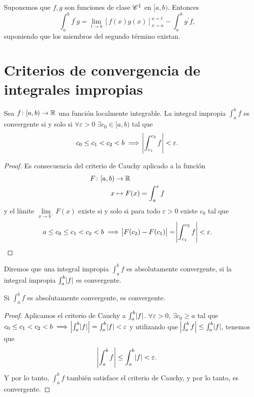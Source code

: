 \begin{prop}
    Suponemos que $f,g$ son funciones de clase $\mathscr{C}^1$ en $[a,b)$. Entonces
    \[
        \int^b_a f^\prime g = \lim_{t \to b} \left[ f(x)g(x)\right]^{x=t}_{x=a}
        - \int^b_a g^\prime f,
    \]
    suponiendo que los miembros del segundo t\'ermino existan.
\end{prop}



\section{Criterios de convergencia de integrales impropias}

\begin{prop}
    Sea $f \colon [a,b) \to \mathbb{R}$ una función localmente integrable. La integral
    impropia $\int^b_a f$ es convergente si y solo si $\forall \varepsilon > 0$ $\exists c_0
    \in [a,b)$ tal que
    \[
        c_0 \leq c_1 < c_2 < b \implies \abs{\int^{c_2}_{c_1} f} < \varepsilon.
    \]
\end{prop}
\begin{proof}
Es consecuencia del criterio de Cauchy aplicado a la función
    \[\begin{aligned}
        F \colon [a,b) &\to \mathbb{R} \\
        x &\mapsto F(x) = \int^x_a f
    \end{aligned}\]
    y el límite $\lim\limits_{x \to b^-}F(x)$ existe si y solo si para todo $\varepsilon >0$
    existe $c_0$ tal que
    \[
        a \leq c_0 \leq c_1 < c_2 < b \implies\abs{F(c_2)-F(c_1)} =
        \abs{\int^{c_2}_{c_1} f} < \varepsilon.
    \]
\end{proof}

\begin{defi}
    Diremos que una integral impropia $\int^b_a f$ es absolutamente convergente,
    si la integral impropia $\int^b_a \abs{f}$ es convergente.
\end{defi}

\begin{prop}
    Si $\int^b_a f$ es absolutamente convergente, es convergente.
\end{prop}
\begin{proof}
    Aplicamos el criterio de Cauchy a $\int^b_a \abs{f}$. $\forall \varepsilon >0$,
    $\exists  c_0 \geq a$ tal que $c_0 \leq c_1 < c_2 < b \implies
    \abs{\int^b_a \abs{f}} = \int^b_a \abs{f} < \varepsilon$ y utilizando que 
    $\abs{\int^b_a f} \leq \int^b_a \abs{f}$, tenemos que
    \[
        \abs{\int^b_a f} \leq \int^b_a \abs{f} < \varepsilon.
    \]
    Y por lo tanto, $\int^b_a f$ tambi\'en satisface el criterio de Cauchy, y por
    lo tanto, es convergente.
\end{proof}

